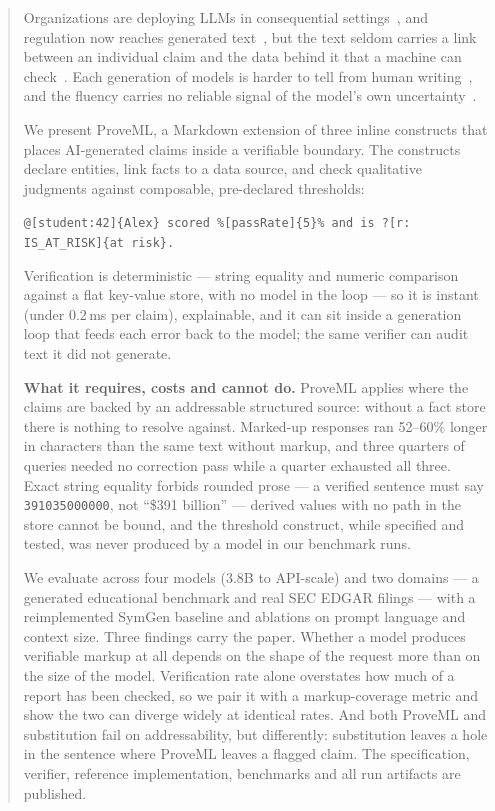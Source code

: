 \documentclass[11pt,a4paper]{article}
\begin{document}
\begin{abstract}
Organizations are deploying LLMs in consequential settings~\citep{aiindex2026,magesh2025}, and regulation now reaches generated text~\citep{euaiact,art50guidelines2026}, but the text seldom carries a link between an individual claim and the data behind it that a machine can check~\citep{citednotverified,rao2026}. Each generation of models is harder to tell from human writing~\citep{clark2021,jones2026}, and the fluency carries no reliable signal of the model's own uncertainty~\citep{zhou2024,xiong2024}.

\vspace{0.4em}
We present ProveML, a Markdown extension of three inline constructs that places AI-generated claims inside a verifiable boundary. The constructs declare entities, link facts to a data source, and check qualitative judgments against composable, pre-declared thresholds:

\vspace{0.3em}
{\small\texttt{@[student:42]\{Alex\} scored \%[passRate]\{5\}\% and is ?[r: IS\_AT\_RISK]\{at risk\}.}}

\vspace{0.3em}
\noindent Verification is deterministic --- string equality and numeric comparison against a flat key-value store, with no model in the loop --- so it is instant (under 0.2\,ms per claim), explainable, and it can sit inside a generation loop that feeds each error back to the model; the same verifier can audit text it did not generate.

\vspace{0.4em}
\textbf{What it requires, costs and cannot do.} ProveML applies where the claims are backed by an addressable structured source: without a fact store there is nothing to resolve against. Marked-up responses ran 52--60\% longer in characters than the same text without markup, and three quarters of queries needed no correction pass while a quarter exhausted all three. Exact string equality forbids rounded prose --- a verified sentence must say \texttt{391035000000}, not ``\$391 billion'' --- derived values with no path in the store cannot be bound, and the threshold construct, while specified and tested, was never produced by a model in our benchmark runs.

\vspace{0.4em}
We evaluate across four models (3.8B to API-scale) and two domains --- a generated educational benchmark and real SEC EDGAR filings --- with a reimplemented SymGen baseline and ablations on prompt language and context size. Three findings carry the paper. Whether a model produces verifiable markup at all depends on the shape of the request more than on the size of the model. Verification rate alone overstates how much of a report has been checked, so we pair it with a markup-coverage metric and show the two can diverge widely at identical rates. And both ProveML and substitution fail on addressability, but differently: substitution leaves a hole in the sentence where ProveML leaves a flagged claim. The specification, verifier, reference implementation, benchmarks and all run artifacts are published.
\end{abstract}
\end{document}
